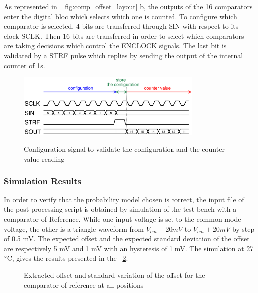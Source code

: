As represented in \figurename~\ref{fig:comp_offset_layout} b, the outputs of the 16 comparators enter the digital bloc which selects which one is counted. To configure which comparator is selected, 4 bits are transferred through SIN with respect to its clock SCLK\@. Then 16 bits are transferred in order to select which comparators are taking decisions which control the ENCLOCK signals. The last bit is validated by a STRF pulse which replies by sending the output of the internal counter of 1s.

\begin{figure}[htp]
    \centering
    \includegraphics[width=0.8\textwidth]{Chapter5/Figs/comp_test/configuration-patternc.ps}
    \label{fig:test-comp-pattern-c-config}
    \caption{Configuration signal to validate the configuration and the counter value reading}
\end{figure}

\subsubsection{Simulation Results}
In order to verify that the probability model chosen is correct, the input file of the post-processing script is obtained by simulation of the test bench with a comparator of Reference. While one input voltage is set to the common mode voltage, the other is a triangle waveform from $V_{cm}-20 mV$ to $V_{cm}+20 mV$ by step of 0.5 mV. The expected offset and the expected standard deviation of the offset are respectively 5 mV and 1 mV with an hysteresis of 1 mV. The simulation at 27$\degree$C, gives the results presented in the \figurename~\ref{fig:offset_conv_verif}.

\begin{figure}[htp]
    \centering
    \begin{subfigure}[b]{0.32\textwidth}
    \end{subfigure}
    \begin{subfigure}[b]{0.32\textwidth}
    \end{subfigure}
    \begin{subfigure}[b]{0.32\textwidth}
    \end{subfigure}
    \caption{Extracted offset and standard variation of the offset for the comparator of reference at all positions}
    \label{fig:offset_conv_verif}
\end{figure}

